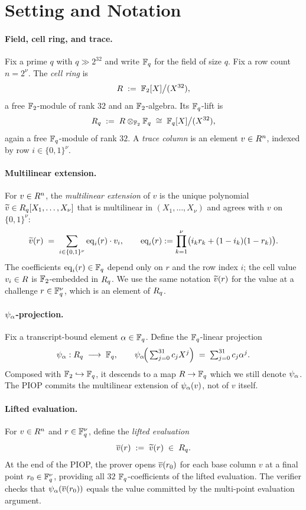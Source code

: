 \section{Setting and Notation}
\label{sec:setting}

\paragraph{Field, cell ring, and trace.} Fix a prime $q$ with $q \gg 2^{32}$
and write $\mathbb{F}_q$ for the field of size $q$. Fix a row count
$n = 2^{\nu}$. The \emph{cell ring} is
\[
  R \;:=\; \mathbb{F}_2[X]\big/(X^{32}),
\]
a free $\mathbb{F}_2$-module of rank $32$ and an $\mathbb{F}_2$-algebra. Its
$\mathbb{F}_q$-lift is
\[
  R_q \;:=\; R \otimes_{\mathbb{F}_2} \mathbb{F}_q \;\cong\;
  \mathbb{F}_q[X]\big/(X^{32}),
\]
again a free $\mathbb{F}_q$-module of rank $32$. A \emph{trace column} is an
element $v \in R^n$, indexed by row $i \in \{0,1\}^{\nu}$.

\paragraph{Multilinear extension.} For $v \in R^n$, the
\emph{multilinear extension} of $v$ is the unique polynomial
$\widetilde{v} \in R_q[X_1,\ldots,X_{\nu}]$ that is multilinear in
$(X_1,\ldots,X_{\nu})$ and agrees with $v$ on $\{0,1\}^{\nu}$:
\[
  \widetilde{v}(r) \;=\; \sum_{i \in \{0,1\}^{\nu}} \operatorname{eq}_i(r) \cdot v_i,
  \qquad \operatorname{eq}_i(r) := \prod_{k=1}^{\nu} \bigl(i_k r_k + (1-i_k)(1-r_k)\bigr).
\]
The coefficients $\operatorname{eq}_i(r) \in \mathbb{F}_q$ depend only on $r$ and the row
index $i$; the cell value $v_i \in R$ is $\mathbb{F}_2$-embedded in
$R_q$. We use the same notation $\widetilde{v}(r)$ for the value at a
challenge $r \in \mathbb{F}_q^{\nu}$, which is an element of $R_q$.

\paragraph{$\psi_{\alpha}$-projection.} Fix a transcript-bound element
$\alpha \in \mathbb{F}_q$. Define the $\mathbb{F}_q$-linear projection
\[
  \psi_{\alpha} : R_q \;\longrightarrow\; \mathbb{F}_q,
  \qquad
  \psi_{\alpha}\!\Big(\textstyle\sum_{j=0}^{31} c_j X^j\Big) \;=\; \sum_{j=0}^{31} c_j \alpha^j.
\]
Composed with $\mathbb{F}_2 \hookrightarrow \mathbb{F}_q$, it descends to a map
$R \to \mathbb{F}_q$ which we still denote $\psi_{\alpha}$. The PIOP commits
the multilinear extension of $\psi_{\alpha}(v)$, not of $v$ itself.

\paragraph{Lifted evaluation.} For $v \in R^n$ and
$r \in \mathbb{F}_q^{\nu}$, define the \emph{lifted evaluation}
\[
  \overline{v}(r) \;:=\; \widetilde{v}(r) \;\in\; R_q.
\]
At the end of the PIOP, the prover opens $\overline{v}(r_0)$ for each base
column $v$ at a final point $r_0 \in \mathbb{F}_q^{\nu}$, providing all $32$
$\mathbb{F}_q$-coefficients of the lifted evaluation. The verifier checks that
$\psi_{\alpha}(\overline{v}(r_0))$ equals the value committed by the multi-point
evaluation argument.

